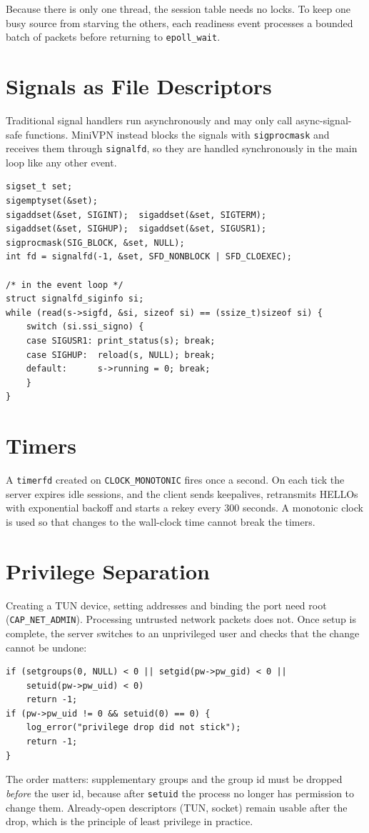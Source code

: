 \documentclass[12pt,a4paper]{report}
\begin{document}
Because there is only one thread, the session table needs no locks. To keep one busy
source from starving the others, each readiness event processes a bounded batch of
packets before returning to \texttt{epoll\_wait}.

\section{Signals as File Descriptors}
Traditional signal handlers run asynchronously and may only call async-signal-safe
functions. MiniVPN instead blocks the signals with \texttt{sigprocmask} and receives
them through \texttt{signalfd}, so they are handled synchronously in the main loop
like any other event.

\begin{lstlisting}[caption={Signal setup and handling (\texttt{src/sys.c}, \texttt{src/server.c})}]
sigset_t set;
sigemptyset(&set);
sigaddset(&set, SIGINT);  sigaddset(&set, SIGTERM);
sigaddset(&set, SIGHUP);  sigaddset(&set, SIGUSR1);
sigprocmask(SIG_BLOCK, &set, NULL);
int fd = signalfd(-1, &set, SFD_NONBLOCK | SFD_CLOEXEC);

/* in the event loop */
struct signalfd_siginfo si;
while (read(s->sigfd, &si, sizeof si) == (ssize_t)sizeof si) {
    switch (si.ssi_signo) {
    case SIGUSR1: print_status(s); break;
    case SIGHUP:  reload(s, NULL); break;
    default:      s->running = 0; break;
    }
}
\end{lstlisting}

\section{Timers}
A \texttt{timerfd} created on \texttt{CLOCK\_MONOTONIC} fires once a second. On each
tick the server expires idle sessions, and the client sends keepalives, retransmits
HELLOs with exponential backoff and starts a rekey every 300 seconds. A monotonic clock
is used so that changes to the wall-clock time cannot break the timers.

\section{Privilege Separation}
Creating a TUN device, setting addresses and binding the port need root
(\texttt{CAP\_NET\_ADMIN}). Processing untrusted network packets does not. Once setup is
complete, the server switches to an unprivileged user and checks that the change cannot
be undone:

\begin{lstlisting}[caption={Dropping privileges (\texttt{src/sys.c})}]
if (setgroups(0, NULL) < 0 || setgid(pw->pw_gid) < 0 ||
    setuid(pw->pw_uid) < 0)
    return -1;
if (pw->pw_uid != 0 && setuid(0) == 0) {
    log_error("privilege drop did not stick");
    return -1;
}
\end{lstlisting}
The order matters: supplementary groups and the group id must be dropped \emph{before}
the user id, because after \texttt{setuid} the process no longer has permission to
change them. Already-open descriptors (TUN, socket) remain usable after the drop, which
is the principle of least privilege in practice.
\end{document}
